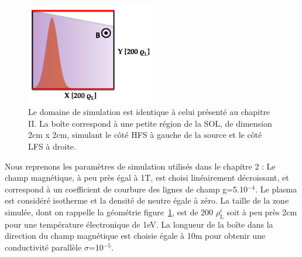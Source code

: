 \begin{refsection}
\begin{itemize}
 \end{itemize} 
\begin{figure}[!htbp]
\centering
\includegraphics[width=0.5\textwidth]{figures/4-tokamSimDomain.png}
\caption{Le domaine de simulation est identique à celui présenté au
chapitre II. La boîte correspond à une petite région de la SOL, de dimension
2cm x 2cm, simulant le côté HFS à gauche de la source et le côté LFS à droite.
\label{4-tokamSimDomain}}
\end{figure}


Nous reprenons les paramètres de simulation utilisés dans le chapitre 2 : Le
champ magnétique, à peu près égal à 1T, est choisi linéairement
décroissant, et correspond à un coefficient de courbure des lignes de champ
g=5.10$^{-4}$.
Le plasma est considéré isotherme et la densité de neutre égale à zéro. La
taille de la zone simulée, dont on rappelle la géométrie
figure~\ref{4-tokamSimDomain}, est de 200 $\rho_\text{L}^i$ soit à peu près
2cm pour une température électronique de 1eV. La longueur de la boîte dans la direction
du champ magnétique est choisie égale à 10m pour obtenir une conductivité
parallèle $\sigma$=10$^{-5}$.


\end{refsection}
